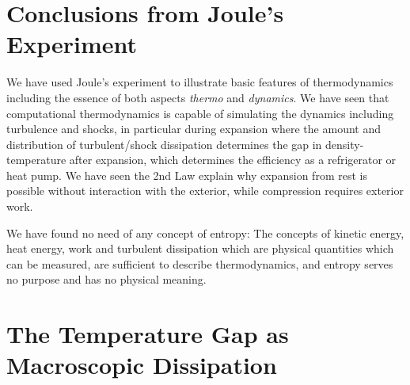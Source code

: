 \section{Conclusions from  Joule's Experiment}

We have used Joule's experiment to illustrate basic features of thermodynamics including the essence of 
both aspects \emph{thermo} and \emph{dynamics}. We have seen that computational thermodynamics is capable
of simulating the dynamics including turbulence and shocks, in particular during expansion where the amount and distribution of turbulent/shock dissipation determines the gap in density-temperature after expansion, which
determines the efficiency as a refrigerator or heat pump. We have seen the 2nd Law explain why 
expansion from rest is possible without interaction with the exterior, while compression requires exterior work.

We have found no need of any concept of entropy: The concepts of kinetic energy, heat energy, work and turbulent dissipation which are physical quantities which can be measured, are sufficient to describe thermodynamics, and entropy serves no purpose and has no physical meaning.


    

















\section{The Temperature Gap as Macroscopic Dissipation}

